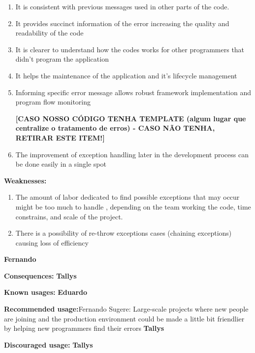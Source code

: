 \documentclass[12pt]{article}
\begin{document}
\begin{flushleft}
\begin{enumerate}
\item It is consistent with previous messages used in other parts of the code.  

\item It provides succinct information of the error increasing the quality and readability of the code

\item It is clearer to understand how the codes works for other programmers that didn’t program the application

\item It helps the maintenance of the application and it's lifecycle management

\item  Informing specific error message allows robust framework implementation and program flow monitoring

\textbf{[CASO NOSSO CÓDIGO TENHA TEMPLATE (algum lugar que centralize o tratamento de erros) - CASO NÃO TENHA, RETIRAR ESTE ITEM!]}
\item The improvement of exception handling later in the development process can be done easily in a single spot

\end{enumerate}



\textbf{Weaknesses:}
\begin{enumerate}
\item The amount of labor dedicated to find possible exceptions that may occur might be too much to handle , depending on the team working the code, time constrains, and scale of the project.

\item There is a possibility of re-throw exceptions cases (chaining exceptions) causing loss of efficiency
\end{enumerate}\textbf{Fernando}\newline 


\textbf{Consequences:}\newline
\textbf{Tallys}


\textbf{Known usages:}\newline
\textbf{Eduardo}

\textbf{Recommended usage:}Fernando Sugere: Large-scale projects where new people are joining and the production environment could be made a little bit friendlier by helping new programmers find their errors\newline
\textbf{Tallys}

\textbf{Discouraged usage:}\newline
\textbf{Tallys}



\end{flushleft}
\end{document}
